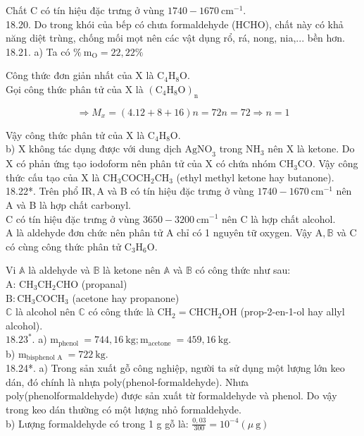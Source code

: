 \documentclass[10pt]{article}
\begin{document}
Chất C có tín hiệu đặc trưng ở vùng $1740-1670 \mathrm{~cm}^{-1}$.\\
18.20. Do trong khói của bếp có chưa formaldehyde (HCHO), chất này có khả năng diệt trùng, chống mối mọt nên các vật dụng rổ, rá, nong, nia,... bền hơn.\\
18.21. a) Ta có $\% \mathrm{~m}_{\mathrm{O}}=22,22 \%$

Công thức đơn giản nhất của X là $\mathrm{C}_{4} \mathrm{H}_{8} \mathrm{O}$.\\
Gọi công thức phân tử của X là $\left(\mathrm{C}_{4} \mathrm{H}_{8} \mathrm{O}\right)_{\mathrm{n}}$

$$
\Rightarrow M_{x}=(4.12+8+16) n=72 n=72 \Rightarrow n=1
$$

Vậy công thức phân tử của X là $\mathrm{C}_{4} \mathrm{H}_{8} \mathrm{O}$.\\
b) X không tác dụng được với dung dịch $\mathrm{AgNO}_{3}$ trong $\mathrm{NH}_{3}$ nên X là ketone. Do X có phản ứng tạo iodoform nên phân tử của X có chứa nhóm $\mathrm{CH}_{3} \mathrm{CO}$. Vậy công thức cấu tạo của X là $\mathrm{CH}_{3} \mathrm{COCH}_{2} \mathrm{CH}_{3}$ (ethyl methyl ketone hay butanone).\\
18.22*. Trên phổ $\mathrm{IR}, \mathrm{A}$ và B có tín hiệu đặc trưng ở vùng $1740-1670 \mathrm{~cm}^{-1}$ nên A và B là hợp chất carbonyl.\\
C có tín hiệu đặc trưng ở vùng $3650-3200 \mathrm{~cm}^{-1}$ nên C là hợp chất alcohol.\\
A là aldehyde đơn chức nên phân tử A chỉ có 1 nguyên tữ oxygen. Vậy $\mathrm{A}, \mathbb{B}$ và C có cùng công thức phân tử $\mathrm{C}_{3} \mathrm{H}_{6} \mathrm{O}$.

Vi $\mathbb{A}$ là aldehyde và $\mathbb{B}$ là ketone nên $\mathbb{A}$ và $\mathbb{B}$ có công thức như sau:\\
A: $\mathrm{CH}_{3} \mathrm{CH}_{2} \mathrm{CHO}$ (propanal)\\
$\mathrm{B}: \mathrm{CH}_{3} \mathrm{COCH}_{3}$ (acetone hay propanone)\\
$\mathbb{C}$ là alcohol nên $\mathbb{C}$ có công thức là $\mathrm{CH}_{2}=\mathrm{CHCH}_{2} \mathrm{OH}$ (prop-2-en-1-ol hay allyl alcohol).\\
$18.23^{*}$. a) $\mathrm{m}_{\text {phenol }}=744,16 \mathrm{~kg} ; \mathrm{m}_{\text {acetone }}=459,16 \mathrm{~kg}$.\\
b) $\mathrm{m}_{\text {bisphenol A }}=722 \mathrm{~kg}$.\\
18.24*. a) Trong sản xuất gỗ công nghiệp, người ta sử dụng một lượng lớn keo dán, đó chính là nhựa poly(phenol-formaldehyde). Nhưa poly(phenolformaldehyde) được sản xuất từ formaldehyde và phenol. Do vậy trong keo dán thường có một lượng nhỏ formaldehyde.\\
b) Lượng formaldehyde có trong 1 g gỗ là: $\frac{0,03}{300}=10^{-4}(\mu \mathrm{~g})$
\end{document}

